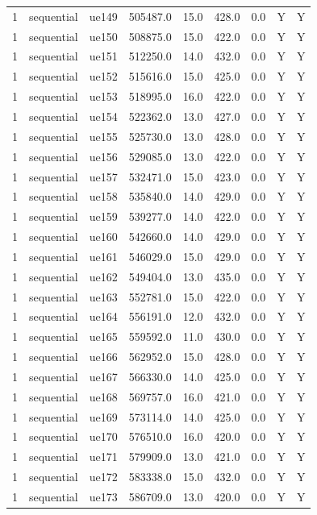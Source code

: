 \begin{table}[ht]
\begin{tabular}{|c|c|c|c|c|c|c|c|c|}
1 & sequential & ue149 & 505487.0 & 15.0 & 428.0 & 0.0 & Y & Y \\
1 & sequential & ue150 & 508875.0 & 15.0 & 422.0 & 0.0 & Y & Y \\
1 & sequential & ue151 & 512250.0 & 14.0 & 432.0 & 0.0 & Y & Y \\
1 & sequential & ue152 & 515616.0 & 15.0 & 425.0 & 0.0 & Y & Y \\
1 & sequential & ue153 & 518995.0 & 16.0 & 422.0 & 0.0 & Y & Y \\
1 & sequential & ue154 & 522362.0 & 13.0 & 427.0 & 0.0 & Y & Y \\
1 & sequential & ue155 & 525730.0 & 13.0 & 428.0 & 0.0 & Y & Y \\
1 & sequential & ue156 & 529085.0 & 13.0 & 422.0 & 0.0 & Y & Y \\
1 & sequential & ue157 & 532471.0 & 15.0 & 423.0 & 0.0 & Y & Y \\
1 & sequential & ue158 & 535840.0 & 14.0 & 429.0 & 0.0 & Y & Y \\
1 & sequential & ue159 & 539277.0 & 14.0 & 422.0 & 0.0 & Y & Y \\
1 & sequential & ue160 & 542660.0 & 14.0 & 429.0 & 0.0 & Y & Y \\
1 & sequential & ue161 & 546029.0 & 15.0 & 429.0 & 0.0 & Y & Y \\
1 & sequential & ue162 & 549404.0 & 13.0 & 435.0 & 0.0 & Y & Y \\
1 & sequential & ue163 & 552781.0 & 15.0 & 422.0 & 0.0 & Y & Y \\
1 & sequential & ue164 & 556191.0 & 12.0 & 432.0 & 0.0 & Y & Y \\
1 & sequential & ue165 & 559592.0 & 11.0 & 430.0 & 0.0 & Y & Y \\
1 & sequential & ue166 & 562952.0 & 15.0 & 428.0 & 0.0 & Y & Y \\
1 & sequential & ue167 & 566330.0 & 14.0 & 425.0 & 0.0 & Y & Y \\
1 & sequential & ue168 & 569757.0 & 16.0 & 421.0 & 0.0 & Y & Y \\
1 & sequential & ue169 & 573114.0 & 14.0 & 425.0 & 0.0 & Y & Y \\
1 & sequential & ue170 & 576510.0 & 16.0 & 420.0 & 0.0 & Y & Y \\
1 & sequential & ue171 & 579909.0 & 13.0 & 421.0 & 0.0 & Y & Y \\
1 & sequential & ue172 & 583338.0 & 15.0 & 432.0 & 0.0 & Y & Y \\
1 & sequential & ue173 & 586709.0 & 13.0 & 420.0 & 0.0 & Y & Y \\

\end{tabular}
\end{table}
